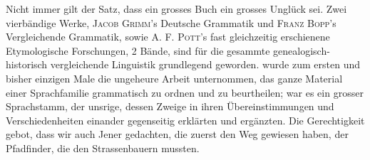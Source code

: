 Nicht immer gilt der Satz, dass ein grosses Buch ein grosses Unglück sei. Zwei vierbändige Werke, \textsc{Jacob Grimm}’s Deutsche Grammatik und \textsc{Franz Bopp}’s Vergleichende Grammatik, sowie \textsc{A. F. Pott}’s fast gleichzeitig erschienene Etymologische Forschungen, 2 Bände,  sind für die gesammte genealogisch-historisch vergleichende Linguistik grundlegend geworden.  wurde zum ersten und bisher einzigen Male die ungeheure Arbeit unternommen, das ganze Material einer Sprachfamilie grammatisch zu ordnen und zu beurtheilen;  war es ein grosser Sprachstamm, der unsrige, dessen Zweige in ihren Übereinstimmungen und Verschiedenheiten einander gegenseitig erklärten und ergänzten.  Die Gerechtigkeit gebot, dass wir auch Jener gedachten, die zuerst den Weg gewiesen haben, der Pfadfinder, die den Strassenbauern  mussten.

